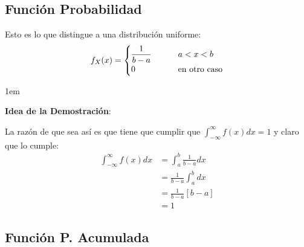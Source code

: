 \documentclass[12pt, fleqn]{report}                             %
\newenvironment{SmallIndentation}[1][0.75em]                    %
        {\begin{adjustwidth}{#1}{}\begin{footnotesize}}             %
        {\end{footnotesize}\end{adjustwidth}}                       %
\DeclareMathOperator \MegaSpace {\quad \quad}                   %
\theoremstyle{break}                                            %
\begin{document}
            \subsection{Función Probabilidad}

                Esto es lo que distingue a una distribución uniforme:
                \begin{equation*}
                    f_X(x) = 
                        \begin{cases}
                            \dfrac{1}{b - a}  \MegaSpace &a < x < b           \\
                            0                 \MegaSpace &$en otro caso$
                        \end{cases}
                \end{equation*}

                \begin{SmallIndentation}[1em]
                    \textbf{Idea de la Demostración}:
                    
                    La razón de que sea así es que tiene que cumplir que 
                    $\int_{-\infty}^\infty f(x) dx = 1$
                    y claro que lo cumple:
                    \begin{align*}
                        \int_{-\infty}^\infty f(x) dx
                            &= \int_a^b \frac{1}{b-a} dx        \\
                            &= \frac{1}{b-a} \int_a^b dx        \\
                            &= \frac{1}{b-a} [b - a]            \\
                            &= 1
                    \end{align*}
                
                \end{SmallIndentation}
                    

            \vspace{1em}
            \subsection{Función P. Acumulada}
\end{document}
